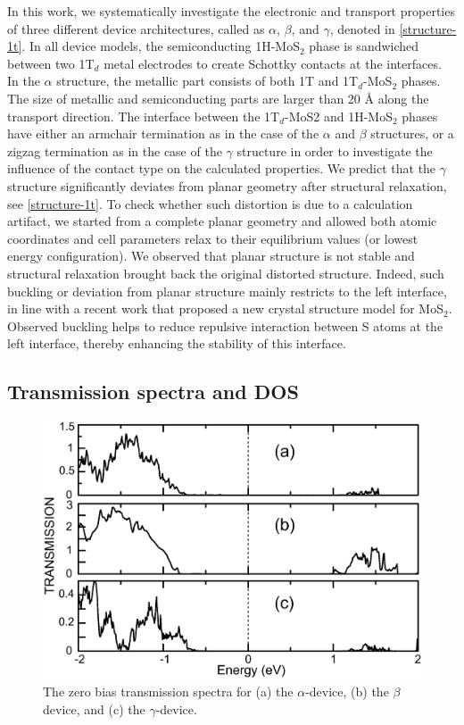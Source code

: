 In this work, we systematically investigate the electronic and transport properties of three different device architectures, called as $\alpha$, $\beta$, and $\gamma$, denoted in \autoref{structure-1t}.  In all device models, the semiconducting 1H-MoS$_2$ phase is sandwiched between two 1T$_d$ metal electrodes to create Schottky contacts at the interfaces. In the $\alpha$ structure, the metallic part consists of both 1T and 1T$_d$-MoS$_2$ phases. The size of metallic and semiconducting parts are larger than 20 {\AA} along the transport direction. The interface between the 1T$_d$-MoS2 and 1H-MoS$_2$ phases have either an armchair termination as in the case of   the $\alpha$ and $\beta$ structures, or a zigzag termination as in the case of the $\gamma$ structure in order to investigate the influence of the contact type on the calculated properties. We predict that the $\gamma$ structure significantly deviates from planar geometry after structural relaxation, see \autoref{structure-1t}. To check whether such distortion is due to a calculation artifact, we started from a complete planar geometry and allowed both atomic coordinates and cell parameters relax to their equilibrium values (or lowest energy configuration). We observed that planar structure is not stable and structural relaxation brought back the original distorted structure. Indeed, such buckling or deviation from planar structure mainly restricts to the left interface, in line with a recent work that proposed a new crystal structure model for MoS$_2$\cite{C5NR07715J}.  Observed buckling helps to reduce repulsive interaction between S atoms at the left interface, thereby enhancing the stability of this interface.  



\subsection{Transmission spectra and DOS}

\begin{figure}[htb]
\centering
\includegraphics[width=0.8\linewidth]{TRANSMISSION-ALL-STRUCTURES.eps}%
\caption{\label{transport} The zero bias transmission spectra for (a) the $\alpha$-device, (b) the $\beta$ device, and (c) the $\gamma$-device. }
\end{figure}


